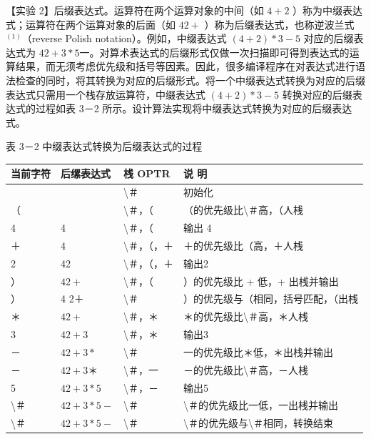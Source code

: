 \documentclass[10pt]{article}
\begin{document}
【实验 2】后缀表达式。运算符在两个运算对象的中间（如 $4+2$ ）称为中缀表达式；运算符在两个运算对象的后面（如 $42+$ ）称为后缀表达式，也称逆波兰式 ${ }^{(1)}$（reverse Polish notation）。例如，中缀表达式 $(4+2) * 3-5$ 对应的后缀表达式为 $42+3 * 5$一。对算术表达式的后缀形式仅做一次扫描即可得到表达式的运算结果，而无须考虑优先级和括号等因素。因此，很多编译程序在对表达式进行语法检查的同时，将其转换为对应的后缀形式。将一个中缀表达式转换为对应的后缀表达式只需用一个栈存放运算符，中缀表达式 $(4+2) * 3-5$ 转换对应的后缀表达式的过程如表 3－2 所示。设计算法实现将中缀表达式转换为对应的后缀表达式。

表 3－2 中缀表达式转换为后缀表达式的过程

\begin{center}
\begin{tabular}{|l|l|l|l|}
\hline
当前字符 & 后缧表达式 & 桟 OPTR & 说 明 \\
\hline
 &  & \textbackslash ＃ & 初始化 \\
\hline
（ &  & \textbackslash ＃，（ & （的优先级比\textbackslash ＃高，（人桟 \\
\hline
4 & 4 & \textbackslash ＃，（ & 输出 4 \\
\hline
＋ & 4 & \textbackslash ＃，（，＋ & ＋的优先级比（高，＋人桟 \\
\hline
2 & 42 & \textbackslash ＃，（，＋ & 输出2 \\
\hline
） & $42+$ & \textbackslash ＃，（ & ）的优先级比 + 低，+ 出桟并输出 \\
\hline
） & 4 2＋ & \textbackslash ＃ & ）的优先级与（相同，括号匹配，（出桟 \\
\hline
＊ & $42+$ & \textbackslash ＃，＊ & ＊的优先级比\textbackslash ＃高，＊人桟 \\
\hline
3 & $42+3$ & \textbackslash ＃，＊ & 输出3 \\
\hline
－ & $42+3 *$ & \textbackslash ＃ & 一的优先级比＊低，＊出栈并输出 \\
\hline
－ & $42+3$＊ & \textbackslash ＃，一 & －的优先级比\textbackslash ＃高，－人桟 \\
\hline
5 & $42+3 * 5$ & \textbackslash ＃，－ & 输出5 \\
\hline
\textbackslash ＃ & $42+3 * 5-$ & \textbackslash ＃ & \textbackslash ＃的优先级比一低，一出桟并输出 \\
\hline
\textbackslash ＃ & $42+3 * 5-$ & \textbackslash ＃ & \textbackslash ＃的优先级与\textbackslash ＃相同，转换结束 \\
\hline
\end{tabular}
\end{center}
\end{document}
